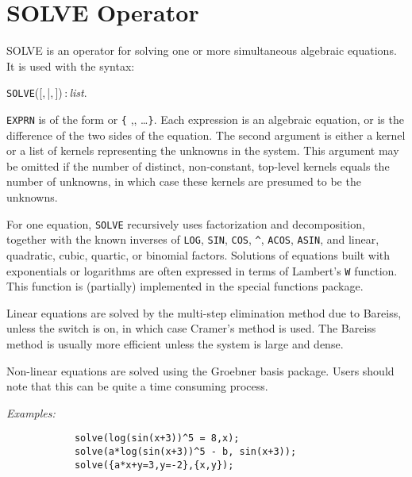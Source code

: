 \section{SOLVE Operator}
\hypertarget{operator:SOLVE}{}
SOLVE is an operator for solving one or more simultaneous algebraic
equations. It is used with the syntax:
\begin{syntax}
  \texttt{SOLVE}([,\,|,\,])\,:\,\textit{list}.
\end{syntax}
\texttt{EXPRN} is of the form  or
\texttt{\{} ,, \dots \texttt{\}}.
Each expression is an
algebraic equation, or is the difference of the two sides of the equation.
The second argument is either a kernel or a list of kernels representing
the unknowns in the system.  This argument may be omitted if the number of
distinct, non-constant, top-level kernels equals the number of unknowns,
in which case these kernels are presumed to be the unknowns.

For one equation, \texttt{SOLVE} recursively uses
factorization and decomposition, together with the known inverses of
\texttt{LOG}, \texttt{SIN}, \texttt{COS}, \texttt{\textasciicircum},
\texttt{ACOS}, \texttt{ASIN}, and
linear, quadratic, cubic, quartic, or binomial factors. Solutions
of equations built with exponentials or logarithms are often
expressed in terms of Lambert's \texttt{W} function.
This function is (partially) implemented in the special functions package.

\hypertarget{switch:CRAMER}{}
Linear equations are solved by the multi-step elimination method due to
Bareiss, unless the switch  is on, in which
case Cramer's method is used.  The Bareiss method is usually more
efficient unless the system is large and dense.

Non-linear equations are solved using the Groebner basis
package.
Users should note that this
can be quite a time consuming process.

\textit{Examples:}
\begin{verbatim}
            solve(log(sin(x+3))^5 = 8,x);
            solve(a*log(sin(x+3))^5 - b, sin(x+3));
            solve({a*x+y=3,y=-2},{x,y});
\end{verbatim}

